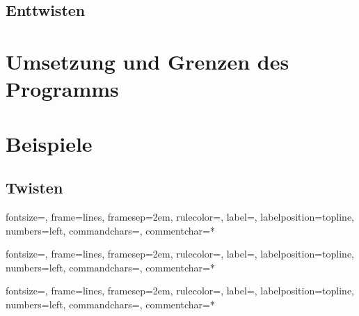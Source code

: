 \documentclass[a4paper, notitlepage, 12pt]{scrartcl}
\begin{document}
\subsection{Enttwisten}

\section{Umsetzung und Grenzen des Programms}

\section{Beispiele}
\subsection{Twisten}
%
{fontsize=\footnotesize,
	frame=lines,  %
	framesep=2em, %
	rulecolor=\color{Gray},
	label=,
	labelposition=topline,
	numbers=left,
	commandchars=\|\(\), %
	commentchar=*        %
}
\begingroup
{}
\endgroup

%
{fontsize=\footnotesize,
	frame=lines,  %
	framesep=2em, %
	rulecolor=\color{Gray},
	label=,
	labelposition=topline,
	numbers=left,
	commandchars=\|\(\), %
	commentchar=*        %
}
\begingroup
{}
\endgroup

%
{fontsize=\footnotesize,
	frame=lines,  %
	framesep=2em, %
	rulecolor=\color{Gray},
	label=,
	labelposition=topline,
	numbers=left,
	commandchars=\|\(\), %
	commentchar=*        %
}
\begingroup
{}
\endgroup
\end{document}
